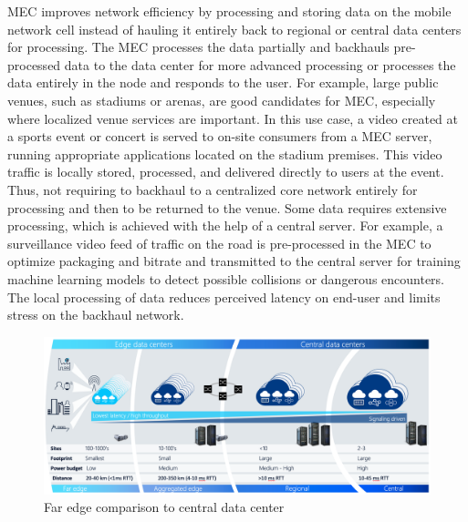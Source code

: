 MEC improves network efficiency by processing and storing data on the mobile network cell instead of hauling it entirely back to regional or central data centers for processing. The MEC processes the data partially and backhauls pre-processed data to the data center for more advanced processing or processes the data entirely in the node and responds to the user. For example, large public venues, such as stadiums or arenas, are good candidates for MEC, especially where localized venue services are important. In this use case, a video created at a sports event or concert is served to on-site consumers from a MEC server, running appropriate applications located on the stadium premises. This video traffic is locally stored, processed, and delivered directly to users at the event. Thus, not requiring to backhaul to a centralized core network entirely for processing and then to be returned to the venue. Some data requires extensive processing, which is achieved with the help of a central server. For example, a surveillance video feed of traffic on the road is pre-processed in the MEC to optimize packaging and bitrate and transmitted to the central server for training machine learning models to detect possible collisions or dangerous encounters. The local processing of data reduces perceived latency on end-user and limits stress on the backhaul network. \cite{Brown2016}

\begin{figure}[ht]
  \begin{center}
    \includegraphics[width=13.5cm]{images/AirFrame.png}
    \caption{Far edge comparison to central data center \cite{AirFrameOpenEdgeServer}}
    \label{fig:AirFrame}
  \end{center}
\end{figure}

